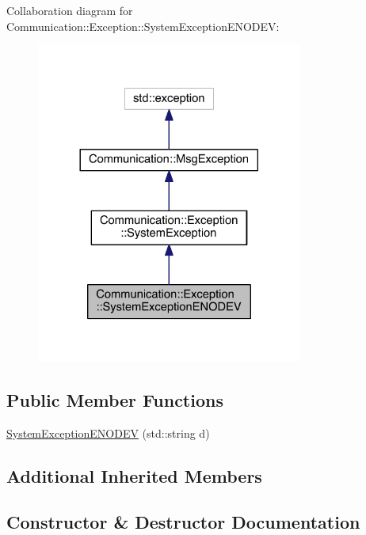 Collaboration diagram for Communication\+:\+:Exception\+:\+:System\+Exception\+E\+N\+O\+D\+E\+V\+:\nopagebreak
\begin{figure}[H]
\begin{center}
\leavevmode
\includegraphics[width=248pt]{class_communication_1_1_exception_1_1_system_exception_e_n_o_d_e_v__coll__graph}
\end{center}
\end{figure}
\subsection*{Public Member Functions}
\begin{DoxyCompactItemize}
\item 
\hyperlink{class_communication_1_1_exception_1_1_system_exception_e_n_o_d_e_v_ac4b9ceaca14807e60dafa9d2a04cbeaa}{System\+Exception\+E\+N\+O\+D\+E\+V} (std\+::string d)
\end{DoxyCompactItemize}
\subsection*{Additional Inherited Members}


\subsection{Constructor \& Destructor Documentation}
\hypertarget{class_communication_1_1_exception_1_1_system_exception_e_n_o_d_e_v_ac4b9ceaca14807e60dafa9d2a04cbeaa}{}
